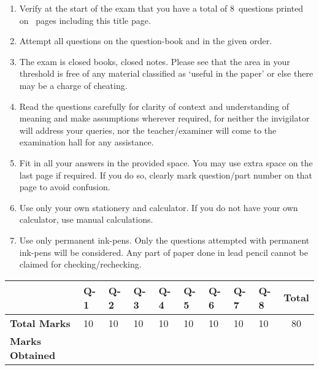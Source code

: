 \documentclass[12pt,a4paper]{article}
\newcommand\TotalMarks{80}
\newcommand\TotalQuestions{8}
\newcommand\TotalPages{\pageref{LastPage}} %
\def\Qone{10}
\def\Qtwo{10}
\def\Qthree{10}
\def\Qfour{10}
\def\Qfive{10}
\def\Qsix{10}
\def\Qseven{10}
\def\Qeight{10}
\begin{document}
\begin{enumerate}
\itemsep0em
\item Verify at the start of the exam that you have a total of \TotalQuestions~questions printed on \TotalPages~pages including this title page.
\item Attempt all questions on the question-book and in the given order.
\item The exam is closed books, closed notes. Please see that the area in your threshold is free of any material classified as `useful in the paper' or else there may be a charge of cheating.
\item Read the questions carefully for clarity of context and understanding of meaning and make assumptions wherever required, for neither the invigilator will address your queries, nor the teacher/examiner will come to the examination hall for any assistance.
\item Fit in all your answers in the provided space. You may use extra space on the last page if required. If you do so, clearly mark question/part number on that page to avoid confusion. 
\item Use only your own stationery and calculator. If you do not have your own calculator, use manual calculations. 
\item Use only permanent ink-pens. Only the questions attempted with permanent ink-pens will be considered. Any part of paper done in lead pencil cannot be claimed for checking/rechecking.
\end{enumerate}
\begin{table}[H]
\begin{center}
\vspace{0.3cm}
	{\footnotesize \begin{tabular}{|C{1.8cm}|C{0.75cm}|C{0.75cm}|C{0.75cm}|C{0.75cm}|C{0.75cm}|C{0.75cm}|C{0.75cm}|C{0.75cm}|c|}
	\hline
		\rule{0pt}{4.6ex} & Q-1 & Q-2 & Q-3 & Q-4 & Q-5 & Q-6 & Q-7 & Q-8 &\textbf{Total}\\[-0.5ex]
		\hline
		\rule{0pt}{2.5ex}\textbf{Total Marks}& \Qone & \Qtwo & \Qthree & \Qfour & \Qfive & \Qsix & \Qseven & \Qeight & \TotalMarks\\
		\hline
		\rule{0pt}{2.5ex}\textbf{Marks Obtained}& & & & & & & & &\\
	\hline
	\end{tabular}}
\end{center}
\end{table}
\end{document}
